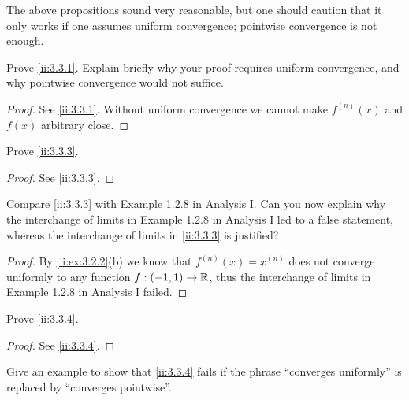 \begin{rmk}\label{ii:3.3.7}
  The above propositions sound very reasonable, but one should caution that it only works if one assumes uniform convergence;
  pointwise convergence is not enough.
\end{rmk}

\exercisesection

\begin{ex}\label{ii:ex:3.3.1}
  Prove \cref{ii:3.3.1}.
  Explain briefly why your proof requires uniform convergence, and why pointwise convergence would not suffice.
\end{ex}

\begin{proof}
  See \cref{ii:3.3.1}.
  Without uniform convergence we cannot make \(f^{(n)}(x)\) and \(f(x)\) arbitrary close.
\end{proof}

\begin{ex}\label{ii:ex:3.3.2}
  Prove \cref{ii:3.3.3}.
\end{ex}

\begin{proof}
  See \cref{ii:3.3.3}.
\end{proof}

\begin{ex}\label{ii:ex:3.3.3}
  Compare \cref{ii:3.3.3} with Example 1.2.8 in Analysis I.
  Can you now explain why the interchange of limits in Example 1.2.8 in Analysis I led to a false statement, whereas the interchange of limits in \cref{ii:3.3.3} is justified?
\end{ex}

\begin{proof}
  By \cref{ii:ex:3.2.2}(b) we know that \(f^{(n)}(x) = x^{(n)}\) does not converge uniformly to any function \(f : (-1, 1) \to \mathbb{R}\), thus the interchange of limits in Example 1.2.8 in Analysis I failed.
\end{proof}

\begin{ex}\label{ii:ex:3.3.4}
  Prove \cref{ii:3.3.4}.
\end{ex}

\begin{proof}
  See \cref{ii:3.3.4}.
\end{proof}

\begin{ex}\label{ii:ex:3.3.5}
  Give an example to show that \cref{ii:3.3.4} fails if the phrase ``converges uniformly'' is replaced by ``converges pointwise''.
\end{ex}

